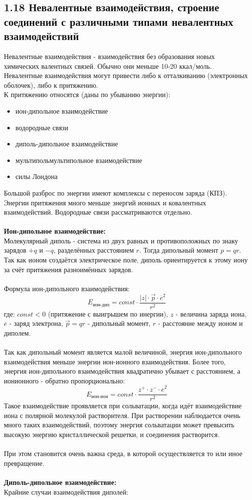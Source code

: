 
\subsection{1.18 Невалентные взаимодействия, строение соединений с различными типами невалентных взаимодействий}
Невалентные взаимодействия - взаимодействия без образования
новых химических валентных связей. Обычно они меньше 10-20
ккал/моль. \\
Невалентные взаимодействия могут привести либо к
отталкиванию (электронных оболочек), либо к притяжению. \\ 
К притяжению относятся (даны по убыванию
энергии): 
\begin{itemize}
	\item ион-дипольное взаимодействие
	\item водородные связи
	\item диполь-дипольное взаимодействие
	\item мультипольмультипольное взаимодействие
	\item силы Лондона
\end{itemize} 
Большой разброс по энергии имеют комплексы с
переносом заряда (КПЗ). Энергии притяжения много меньше энергий
ионных и ковалентных взаимодействий. Водородные связи
рассматриваются отдельно. \\ \\
\textbf{Ион-дипольное взаимодействие:} \\
	Молекулярный диполь - система из двух равных и
	противоположных по знаку зарядов $+q$ и $-q$, разделённых расстоянием
	$r$. Тогда дипольный момент $p=qr$. Так как ионом создаётся
	электрическое поле, диполь ориентируется к этому иону за счёт
	притяжения разноимённых зарядов. \\ \\
	Формула ион-дипольного взаимодействия:
	\[
	E_{\text{ион-дип}} = const \cdot \dfrac{|z| \cdot \vec{p} \cdot \overline{e}^2}{r^2}
	\]
	где: $const < 0$ (притяжение с выигрышем по инергии), $z$ - величина заряда иона, $\overline{e}$ - заряд электрона,  $\vec{p}=qr$ - дипольный момент, $r$ - расстояние между ионом и диполем. \\ \\
	Так как дипольный момент является малой величиной, энергия
	ион-дипольного взаимодействия меньше энергии ион-ионного
	взаимодействия. Более того, энергия ион-дипольного
	взаимодействия квадратично убывает с расстоянием, а ионионного - обратно пропорционально:
	\[
	E_{\text{ион-ион}} = const \cdot \dfrac{z^+ \cdot z^- \cdot \overline{e}^2 }{r^2}
	\]
	Такое взаимодействие проявляется при сольватации, когда идёт
	взаимодействие иона с полярной молекулой растворителя. При
	растворении наблюдается очень много таких взаимодействий,
	поэтому энергия сольватации может превысить высокую энергию
	кристаллической решетки, и соединения растворится.  \\ \\
	При этом становится очень важна среда, в которой осуществляется
	то или иное превращение. \\ \\
	\textbf{Диполь-дипольное взаимодействие:} \\
	Крайние случаи взаимодействия диполей:
	
